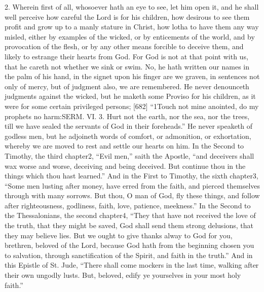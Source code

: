 2. Wherein first of all, whosoever hath an eye to see, let him open it, and he shall well perceive how careful the Lord is for his children, how desirous to see them profit and grow up to a manly stature in Christ, how lotha to have them any way misled, either by examples of the wicked, or by enticements of the world, and by provocation of the flesh, or by any other means forcible to deceive them, and likely to estrange their hearts from God. For God is not at that point with us, that he careth not whether we sink or swim. No, he hath written our names in the palm of his hand, in the signet upon his finger are we graven, in sentences not only of mercy, but of judgment also, we are remembered. He never denounceth judgments against the wicked, but he maketh some Proviso for his children, as it were for some certain privileged persons; [682] “1Touch not mine anointed, do my prophets no harm:SERM. VI. 3. Hurt not the earth, nor the sea, nor the trees, till we have sealed the servants of God in their foreheads.” He never speaketh of godless men, but he adjoineth words of comfort, or admonition, or exhortation, whereby we are moved to rest and settle our hearts on him. In the Second to Timothy, the third chapter2, “Evil men,” saith the Apostle, “and deceivers shall wax worse and worse, deceiving and being deceived. But continue thou in the things which thou hast learned.” And in the First to Timothy, the sixth chapter3, “Some men lusting after money, have erred from the faith, and pierced themselves through with many sorrows. But thou, O man of God, fly these things, and follow after righteousness, godliness, faith, love, patience, meekness.” In the Second to the Thessalonians, the second chapter4, “They that have not received the love of the truth, that they might be saved, God shall send them strong delusions, that they may believe lies. But we ought to give thanks alway to God for you, brethren, beloved of the Lord, because God hath from the beginning chosen you to salvation, through sanctification of the Spirit, and faith in the truth.” And in this Epistle of St. Jude, “There shall come mockers in the last time, walking after their own ungodly lusts. But, beloved, edify ye yourselves in your most holy faith.”

